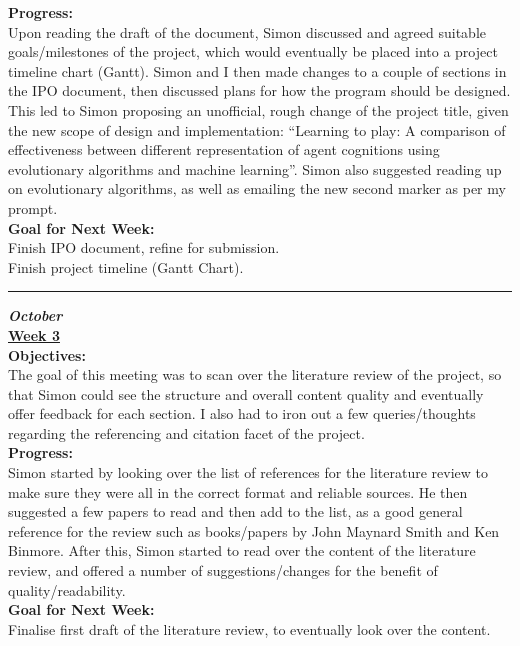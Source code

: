 \documentclass[12pt,a4paper]{article}
\begin{document}
\begin{appendices}
\textbf{Progress:} \\
Upon reading the draft of the document, Simon discussed and agreed suitable goals/milestones of the project, which would eventually be placed into a project timeline chart (Gantt). Simon and I then made changes to a couple of sections in the IPO document, then discussed plans for how the program should be designed. This led to Simon proposing an unofficial, rough change of the project title, given the new scope of design and implementation: “Learning to play: A comparison of effectiveness between different representation of agent cognitions using evolutionary algorithms and machine learning”. Simon also suggested reading up on evolutionary algorithms, as well as emailing the new second marker as per my prompt. \\

\textbf{Goal for Next Week:} \\
Finish IPO document, refine for submission. \\
Finish project timeline (Gantt Chart). \\

\hrule

\textbf{\textit{October}} \\
\newline
\textbf{\underline{Week 3}} \\
\newline
\textbf{Objectives:} \\
The goal of this meeting was to scan over the literature review of the project, so that Simon could see the structure and overall content quality and eventually offer feedback for each section. I also had to iron out a few queries/thoughts regarding the referencing and citation facet of the project. \\

\textbf{Progress:} \\
Simon started by looking over the list of references for the literature review to make sure they were all in the correct format and reliable sources. He then suggested a few papers to read and then add to the list, as a good general reference for the review such as books/papers by John Maynard Smith and Ken Binmore. After this, Simon started to read over the content of the literature review, and offered a number of suggestions/changes for the benefit of quality/readability. \\

\textbf{Goal for Next Week:} \\
Finalise first draft of the literature review, to eventually look over the content. \\


\end{appendices}
\end{document}
